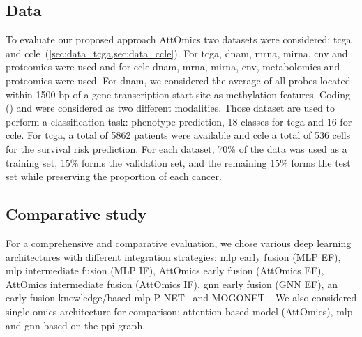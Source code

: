 \documentclass[../main.tex]{subfiles}
\begin{document}
	\subsection{Data}
	    To evaluate our proposed approach AttOmics two datasets were considered: \gls{tcga} and \gls{ccle}~(\cref{sec:data_tcga,sec:data_ccle}).
	    For \gls{tcga}, \Gls{dnam}, \gls{mrna}, \gls{mirna}, \gls{cnv} and proteomics were used and for \gls{ccle} \gls{dnam}, \gls{mrna}, \gls{mirna}, \gls{cnv}, metabolomics and proteomics were used.
	    For \gls{dnam}, we considered the average of all probes located within 1500 bp of a gene transcription start site as methylation features.
	    Coding () and  were considered as two different modalities.
	    Those dataset are used to perform a classification task: phenotype prediction, 18 classes for \gls{tcga} and 16 for \gls{ccle}.
	    For \gls{tcga}, a total of 5862 patients were available and \gls{ccle} a total of 536 cells for the survival risk prediction.
	    For each dataset, 70\% of the data was used as a training set, 15\% forms the validation set, and the remaining 15\% forms the test set while preserving the proportion of each cancer.

	\subsection{Comparative study}
	    For a comprehensive and comparative evaluation, we chose various deep learning architectures with different integration strategies: \gls{mlp} early fusion (MLP EF), \gls{mlp} intermediate fusion (MLP IF), AttOmics early fusion (AttOmics EF), AttOmics intermediate fusion (AttOmics IF), \gls{gnn} early fusion (GNN EF), an early fusion knowledge\-/based \gls{mlp} P-NET~\cite{PNet} and MOGONET~\cite{MOGONET}.
	    We also considered single-omics architecture for comparison: attention-based model (AttOmics), \gls{mlp} and \gls{gnn} based on the \gls{ppi} graph.
\end{document}
